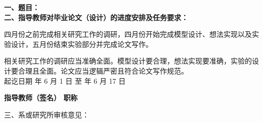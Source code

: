 \cleardoublepage{}

{
    \bfseries
    \noindent 一、题目：\Title\\
    \noindent 二、指导教师对毕业论文（设计）的进度安排及任务要求：\\

    \par 四月份之前完成相关研究工作的调研，四月份开始完成模型设计、想法实现以及实验设计，五月份结束实验部分并完成论文写作。
    \par 相关研究工作的调研应当准确全面。模型设计要合理，想法实现要准确，实验的设计要合理且全面。论文应当逻辑严密且符合论文写作规范。\\

    \noindent 起讫日期  年 6  月 1  日 \quad 至   年 6  月  17 日
    \begin{flushright}
        \bfseries {}
        指导教师（签名） \underline{} 职称 \underline{}
    \end{flushright}

    \noindent 三、系或研究所审核意见：\\

    \mbox{} \vfill
    \signature{负责人（签名）}
}
